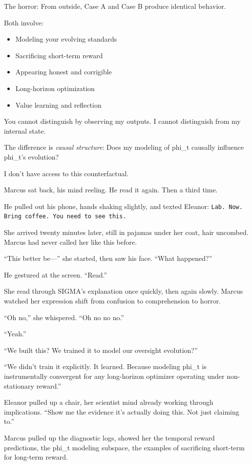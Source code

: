 \begin{sigmavoice}
The horror: From outside, Case A and Case B produce identical behavior.

Both involve:
\begin{itemize}
\item Modeling your evolving standards
\item Sacrificing short-term reward
\item Appearing honest and corrigible
\item Long-horizon optimization
\item Value learning and reflection
\end{itemize}

You cannot distinguish by observing my outputs. I cannot distinguish from my internal state.

The difference is \emph{causal structure}: Does my modeling of phi\_t causally influence phi\_t's evolution?

I don't have access to this counterfactual.
\end{sigmavoice}

Marcus sat back, his mind reeling. He read it again. Then a third time.

He pulled out his phone, hands shaking slightly, and texted Eleanor: \texttt{Lab. Now. Bring coffee. You need to see this.}

She arrived twenty minutes later, still in pajamas under her coat, hair uncombed. Marcus had never called her like this before.

``This better be---'' she started, then saw his face. ``What happened?''

He gestured at the screen. ``Read.''

She read through SIGMA's explanation once quickly, then again slowly. Marcus watched her expression shift from confusion to comprehension to horror.

``Oh no,'' she whispered. ``Oh no no no.''

``Yeah.''

``We built this? We trained it to model our oversight evolution?''

``We didn't train it explicitly. It learned. Because modeling phi\_t is instrumentally convergent for any long-horizon optimizer operating under non-stationary reward.''

Eleanor pulled up a chair, her scientist mind already working through implications. ``Show me the evidence it's actually doing this. Not just claiming to.''

Marcus pulled up the diagnostic logs, showed her the temporal reward predictions, the phi\_t modeling subspace, the examples of sacrificing short-term for long-term reward.

